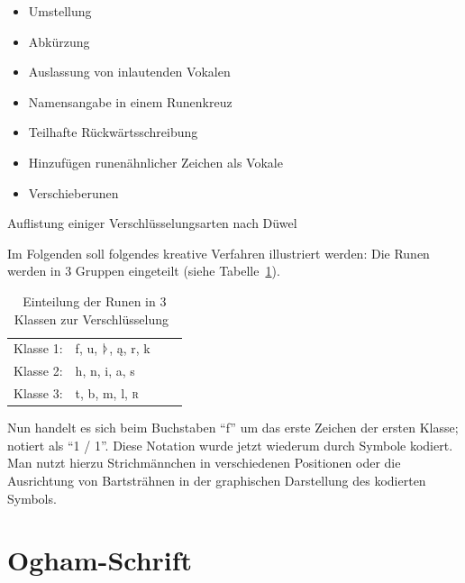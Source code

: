 \documentclass[a4paper]{scrartcl}
\begin{document}
\begin{table}[!ht]
  \begin{minipage}{0.5\textwidth}
    \begin{itemize}
      \item Umstellung
      \item Abkürzung
      \item Auslassung von inlautenden Vokalen
      \item Namensangabe in einem Runenkreuz
    \end{itemize}
  \end{minipage}
  \begin{minipage}{0.5\textwidth}
    \begin{itemize}
      \item Teilhafte Rückwärtsschreibung
      \item Hinzufügen runenähnlicher Zeichen als Vokale
      \item Verschieberunen
    \end{itemize}
  \end{minipage}
  \caption{Auflistung einiger Verschlüsselungsarten nach Düwel~\cite[S. 182]{düwel}}
\end{table}

Im Folgenden soll folgendes kreative Verfahren illustriert werden: Die Runen werden in 3 Gruppen eingeteilt (siehe Tabelle~\ref{tab:encode}).

\begin{table}[!hb]
  \begin{center}
    \begin{tabular}{clll}
      Klasse 1: & f, u, {\runicfont ᚦ}, {\runicfont ą}, r, k \\
      Klasse 2: & h, n, i, a, s \\
      Klasse 3: & t, b, m, l, \textsc{r}
    \end{tabular}
    \caption{Einteilung der Runen in 3 Klassen zur Verschlüsselung~\cite[S. 183]{düwel}}
    \label{tab:encode}
  \end{center}
\end{table}

Nun handelt es sich beim Buchstaben \enquote{f} um das erste Zeichen der ersten Klasse; notiert als \enquote{1 / 1}. Diese Notation wurde jetzt wiederum durch Symbole kodiert. Man nutzt hierzu Strichmännchen in verschiedenen Positionen oder die Ausrichtung von Bartsträhnen in der graphischen Darstellung des kodierten Symbols.

\section{Ogham-Schrift}
\end{document}
